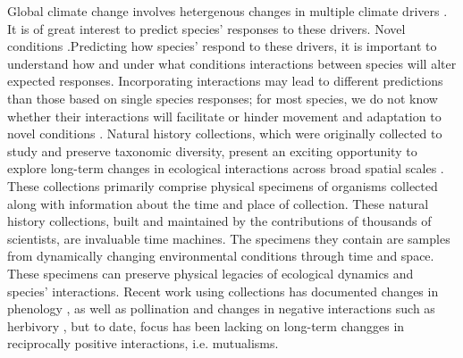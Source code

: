 \documentclass[11pt]{article}
\begin{document}
Global climate change involves hetergenous changes in multiple climate drivers \citep{IPCC2012managing}. 
It is of great interest to predict species' responses to these drivers.
Novel conditions .Predicting how species' respond to these drivers, it is important to understand how and under what conditions interactions between species will alter expected responses. 
Incorporating interactions may lead to different predictions than those based on single species responses; for most species, we do not know whether their interactions will facilitate or hinder movement and adaptation to novel conditions \cite{gilman2010framework}. 
Natural history collections, which were originally collected to study and preserve taxonomic diversity, present an exciting opportunity to explore long-term changes in ecological interactions across broad spatial scales \citep{meineke2018unrealized}. 
These collections primarily comprise physical specimens of organisms collected along with information about the time and place of collection. 
These natural history collections, built and maintained by the contributions of thousands of scientists, are invaluable time machines. 
The specimens they contain are samples from dynamically changing environmental conditions through time and space.
These specimens can preserve physical legacies of ecological dynamics and species' interactions. 
Recent work using collections has documented changes in phenology \citep{willis2017old, park2019herbarium, berg2019examination}, as well as pollination \citep{pauw2011reconstruction, duan2019century} and changes in negative interactions such as herbivory \citep{meineke2019herbarium}, but to date, focus has been lacking on long-term changges in reciprocally positive interactions, i.e. mutualisms. 
\end{document}
